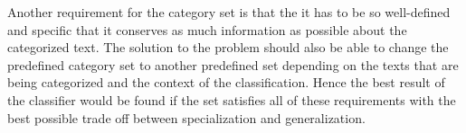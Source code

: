 Another requirement for the category set is that the it has to be so well-defined and specific that it conserves as much information as possible about the categorized text. The solution to the problem should also be able to change the predefined category set to another predefined set depending on the texts that are being categorized and the context of the classification.
Hence the best result of the classifier would be found if the set satisfies all of these requirements with the best possible trade off between specialization and generalization. 